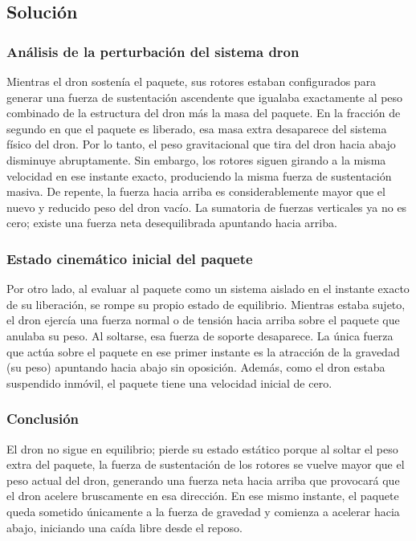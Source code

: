 \documentclass[12pt, a4paper]{article}
\begin{document}
\subsection*{Solución}

\subsubsection*{Análisis de la perturbación del sistema dron}
Mientras el dron sostenía el paquete, sus rotores estaban configurados para generar una fuerza de sustentación ascendente que igualaba exactamente al peso combinado de la estructura del dron más la masa del paquete. En la fracción de segundo en que el paquete es liberado, esa masa extra desaparece del sistema físico del dron. Por lo tanto, el peso gravitacional que tira del dron hacia abajo disminuye abruptamente.
Sin embargo, los rotores siguen girando a la misma velocidad en ese instante exacto, produciendo la misma fuerza de sustentación masiva. De repente, la fuerza hacia arriba es considerablemente mayor que el nuevo y reducido peso del dron vacío. La sumatoria de fuerzas verticales ya no es cero; existe una fuerza neta desequilibrada apuntando hacia arriba.

\subsubsection*{Estado cinemático inicial del paquete}
Por otro lado, al evaluar al paquete como un sistema aislado en el instante exacto de su liberación, se rompe su propio estado de equilibrio. Mientras estaba sujeto, el dron ejercía una fuerza normal o de tensión hacia arriba sobre el paquete que anulaba su peso. Al soltarse, esa fuerza de soporte desaparece. La única fuerza que actúa sobre el paquete en ese primer instante es la atracción de la gravedad (su peso) apuntando hacia abajo sin oposición. Además, como el dron estaba suspendido inmóvil, el paquete tiene una velocidad inicial de cero.

\subsubsection*{Conclusión}
El dron no sigue en equilibrio; pierde su estado estático porque al soltar el peso extra del paquete, la fuerza de sustentación de los rotores se vuelve mayor que el peso actual del dron, generando una fuerza neta hacia arriba que provocará que el dron acelere bruscamente en esa dirección. En ese mismo instante, el paquete queda sometido únicamente a la fuerza de gravedad y comienza a acelerar hacia abajo, iniciando una caída libre desde el reposo.
\end{document}
